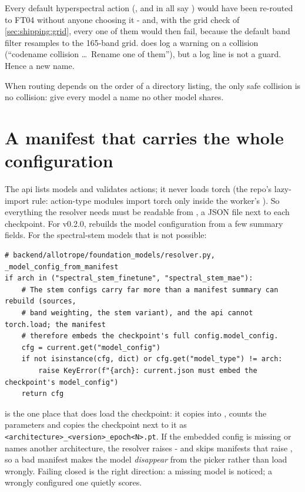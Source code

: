 Every default hyperspectral action (,  and  in
 all say ) would have been re-routed to FT04 without
anyone choosing it - and, with the grid check of \cref{sec:shipping:grid}, every one of them would then fail, because
the default band filter resamples to the 165-band grid.  does log a warning on a collision
(``codename collision \ldots\ Rename one of them''), but a log line is not a guard. Hence a new name.

\begin{keypoint}
When routing depends on the order of a directory listing, the only safe collision is no collision: give every model a
name no other model shares.
\end{keypoint}

\section{A manifest that carries the whole configuration}\label{sec:shipping:manifest}

The api lists models and validates actions; it never loads torch (the repo's lazy-import rule: action-type modules import
torch only inside the worker's ). So everything the resolver needs must be readable from ,
a JSON file next to each checkpoint. For v0.2.0,  rebuilds the model configuration from
a few summary fields. For the spectral-stem models that is not possible:

\begin{lstlisting}
# backend/allotrope/foundation_models/resolver.py, _model_config_from_manifest
if arch in ("spectral_stem_finetune", "spectral_stem_mae"):
    # The stem configs carry far more than a manifest summary can rebuild (sources,
    # band weighting, the stem variant), and the api cannot torch.load; the manifest
    # therefore embeds the checkpoint's full config.model_config.
    cfg = current.get("model_config")
    if not isinstance(cfg, dict) or cfg.get("model_type") != arch:
        raise KeyError(f"{arch}: current.json must embed the checkpoint's model_config")
    return cfg
\end{lstlisting}

 is the one place that does load the checkpoint: it copies
 into , counts the parameters and copies the checkpoint
next to it as \texttt{<architecture>\_<version>\_epoch<N>.pt}. If the embedded config is missing or names another
architecture, the resolver raises  - and  skips manifests that raise ,
so a bad manifest makes the model \emph{disappear} from the picker rather than load wrongly. Failing closed is the right
direction: a missing model is noticed; a wrongly configured one quietly scores.


